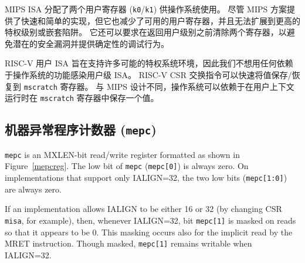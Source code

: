 \iffalse
\begin{commentary}
The MIPS ISA allocated two user registers ({\tt k0}/{\tt k1}) for use
by the operating system.  Although the MIPS scheme provides a fast and
simple implementation, it also reduces available user registers,  and
does not scale to further privilege levels, or nested traps.  It can
also require both registers are cleared before returning to user level
to avoid a potential security hole and to provide deterministic
debugging behavior.

The RISC-V user ISA was designed to support many possible privileged
system environments and so we did not want to infect the user-level
ISA with any OS-dependent features.  The RISC-V CSR swap instructions
can quickly save/restore values to the {\tt mscratch} register.
Unlike the MIPS design, the OS can rely on holding a value in the {\tt
  mscratch} register while the user context is running.
\end{commentary}
\fi

\begin{commentary}
MIPS ISA 分配了两个用户寄存器 ({\tt k0}/{\tt k1}) 供操作系统使用。 尽管 MIPS 方案提供了快速和简单的实现，但它也减少了可用的用户寄存器，并且无法扩展到更高的特权级别或嵌套陷阱。 它还可以要求在返回用户级别之前清除两个寄存器，以避免潜在的安全漏洞并提供确定性的调试行为。

RISC-V 用户 ISA 旨在支持许多可能的特权系统环境，因此我们不想用任何依赖于操作系统的功能感染用户级 ISA。 RISC-V CSR 交换指令可以快速将值保存/恢复到 {\tt mscratch} 寄存器。 与 MIPS 设计不同，操作系统可以依赖于在用户上下文运行时在 {\tt mscratch} 寄存器中保存一个值。
\end{commentary}


\subsection{机器异常程序计数器 ({\tt mepc})}

\iffalse
{\tt mepc} is an MXLEN-bit read/write register formatted as shown in
Figure~\ref{mepcreg}.  The low bit of {\tt mepc} ({\tt mepc[0]}) is
always zero.  On implementations that support only IALIGN=32, the two low bits
({\tt mepc[1:0]}) are always zero.

If an implementation allows IALIGN to be either 16 or 32 (by
changing CSR {\tt misa}, for example), then, whenever IALIGN=32, bit
{\tt mepc[1]} is masked on reads so that it appears to be 0.  This
masking occurs also for the implicit read by the MRET instruction.
Though masked, {\tt mepc[1]} remains writable when IALIGN=32.


